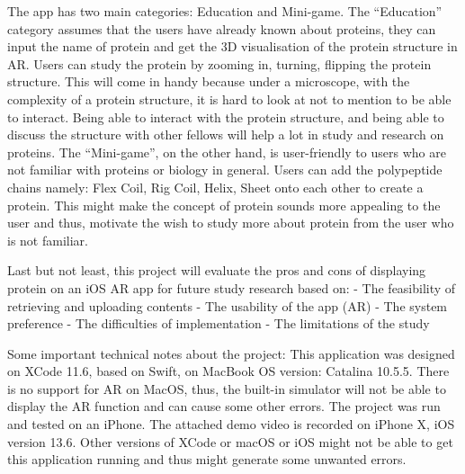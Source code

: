 The app has two main categories: Education and Mini-game. 
The “Education” category assumes that the users have already known about proteins, they can input the name of protein and get the 3D visualisation of the protein structure in AR. Users can study the protein by zooming in, turning, flipping the protein structure. This will come in handy because under a microscope, with the complexity of a protein structure, it is hard to look at not to mention to be able to interact. Being able to interact with the protein structure, and being able to discuss the structure with other fellows will help a lot in study and research on proteins. 
The “Mini-game”, on the other hand, is user-friendly to users who are not familiar with proteins or biology in general. Users can add the polypeptide chains namely: Flex Coil, Rig Coil, Helix, Sheet onto each other to create a protein. This might make the concept of protein sounds more appealing to the user and thus, motivate the wish to study more about protein from the user who is not familiar. 

Last but not least, this project will evaluate the pros and cons of displaying protein on an iOS AR app for future study research based on:
- The feasibility of retrieving and uploading contents
- The usability of the app (AR)
- The system preference 
- The difficulties of implementation
- The limitations of the study

Some important technical notes about the project:
This application was designed on XCode 11.6, based on Swift, on MacBook OS version: Catalina 10.5.5. There is no support for AR on MacOS, thus, the built-in simulator will not be able to display the AR function and can cause some other errors. The project was run and tested on an iPhone. The attached demo video is recorded on iPhone X, iOS version 13.6. Other versions of XCode or macOS or iOS might not be able to get this application running and thus might generate some unwanted errors. 

